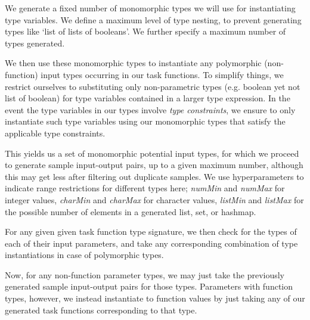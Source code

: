 \documentclass{article}
\begin{document}
We generate a fixed number of monomorphic types we will use for instantiating type variables.
We define a
maximum level of type nesting,
to prevent generating types like `list of lists of booleans'.
We further specify a maximum number of types generated.

We then use these monomorphic types to instantiate any polymorphic
(non-function) input types occurring in our task functions.
To simplify things, we restrict ourselves to substituting only non-parametric types (e.g. boolean yet not list of boolean) for type variables contained in a larger type expression.
In the event the type variables in our types involve \emph{type constraints},
we ensure to only instantiate such type variables using our monomorphic types that satisfy the applicable type constraints.

This yields us a set of monomorphic potential input types,
for which we proceed to generate sample input-output pairs,
up to a given maximum number,
although this may get less after filtering out duplicate samples.
We use hyperparameters to indicate range restrictions for different types here;
\emph{numMin} and \emph{numMax} for integer values,
\emph{charMin} and \emph{charMax} for character values,
\emph{listMin} and \emph{listMax} for the possible number of elements in a generated list, set, or hashmap.

For any given given task function type signature,
we then check for the types of each of their input parameters,
and take any corresponding combination of type instantiations in case of polymorphic types.

Now, for any non-function parameter types,
we may just take the previously generated sample input-output pairs for those types.
Parameters with function types, however,
we instead instantiate to function values by just taking
any of our generated task functions corresponding to that type.
\end{document}
